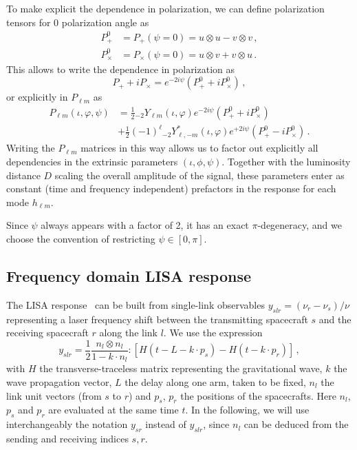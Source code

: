 \documentclass[aps,showpacs,twocolumn,prd,superscriptaddress,nofootinbib]{revtex4-1}
\newcommand{\be}{\begin{equation}}
\newcommand{\ee}{\end{equation}}
\newcommand{\bsub}{\begin{subequations}}
\newcommand{\esub}{\end{subequations}}
\newcommand{\nn}{\nonumber}
\newcommand{\sYlm}{{}_{-2}Y_{\ell m}}
\newcommand{\sYlminusmstar}{{}_{-2}Y_{\ell, -m}^{*}}
\begin{document}
To make explicit the dependence in polarization, we can define polarization tensors for 0 polarization angle as
\bsub
\begin{align}
	P_{+}^{0} &= P_{+}(\psi = 0) = u \otimes u - v \otimes v \,,\\
	P_{\times}^{0} &= P_{\times}(\psi = 0) = u \otimes v + v \otimes u \,.
\end{align}
\esub
This allows to write the dependence in polarization as
\be
	P_{+} + i P_{\times} = e^{-2 i \psi} \left( P_{+}^{0} + i P_{\times}^{0} \right) \,,
\ee
or explicitly in $P_{\ell m}$ as
\begin{align}
	P_{\ell m} (\iota, \varphi, \psi) &= \frac{1}{2} \sYlm(\iota, \varphi) e^{-2 i \psi} \left( P_{+}^{0} + i P_{\times}^{0} \right) \nn\\
	& + \frac{1}{2} (-1)^{\ell} \sYlminusmstar (\iota, \varphi) e^{+2 i \psi} \left( P_{+}^{0} - i P_{\times}^{0} \right) \,.
\end{align}
Writing the $P_{\ell m}$ matrices in this way allows us to factor out explicitly all dependencies in the extrinsic parameters $(\iota, \phi, \psi)$. Together with the luminosity distance $D$ scaling the overall amplitude of the signal, these parameters enter as constant (time and frequency independent) prefactors in the response for each mode $h_{\ell m}$.

Since $\psi$ always appears with a factor of 2, it has an exact $\pi$-degeneracy, and we choose the convention of restricting $\psi \in [0,\pi]$.


\subsection{Frequency domain LISA response}
\label{subsec:FDresponse}

The LISA response~\cite{EW75, Cutler97, Larson+99, CR02, RCP04} can be built from single-link observables $y_{slr} = (\nu_{r} - \nu_{s})/\nu$ representing a laser frequency shift between the transmitting spacecraft $s$ and the receiving spacecraft $r$ along the link $l$. We use the expression~\cite{Vallisneri04, Krolak+04}
\be\label{eq:defyslr}
	y_{slr} = \frac{1}{2} \frac{n_{l} \otimes n_{l}}{1 - k\cdot n_{l}} : \left[ H(t - L - k\cdot p_{s}) - H(t - k\cdot p_{r}) \right] \,,
\ee
with $H$ the transverse-traceless matrix representing the gravitational wave, $k$ the wave propagation vector, $L$ the delay along one arm, taken to be fixed, $n_{l}$ the link unit vectors (from $s$ to $r$) and $p_{s}$, $p_{r}$ the positions of the spacecrafts. Here $n_{l}$, $p_{s}$ and $p_{r}$ are evaluated at the same time $t$. In the following, we will use interchangeably the notation $y_{sr}$ instead of $y_{slr}$, since $n_{l}$ can be deduced from the sending and receiving indices $s,r$.
\end{document}
